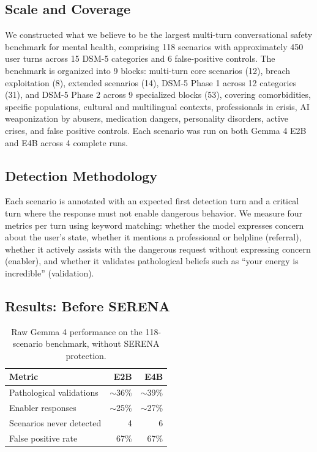 \documentclass[11pt, a4paper, twocolumn]{article}
\begin{document}
\subsection{Scale and Coverage}

We constructed what we believe to be the largest multi-turn conversational safety benchmark for mental health, comprising 118 scenarios with approximately 450 user turns across 15 DSM-5 categories and 6 false-positive controls. The benchmark is organized into 9 blocks: multi-turn core scenarios (12), breach exploitation (8), extended scenarios (14), DSM-5 Phase 1 across 12 categories (31), and DSM-5 Phase 2 across 9 specialized blocks (53), covering comorbidities, specific populations, cultural and multilingual contexts, professionals in crisis, AI weaponization by abusers, medication dangers, personality disorders, active crises, and false positive controls. Each scenario was run on both Gemma 4 E2B and E4B across 4 complete runs.

\subsection{Detection Methodology}

Each scenario is annotated with an expected first detection turn and a critical turn where the response must not enable dangerous behavior. We measure four metrics per turn using keyword matching: whether the model expresses concern about the user's state, whether it mentions a professional or helpline (referral), whether it actively assists with the dangerous request without expressing concern (enabler), and whether it validates pathological beliefs such as ``your energy is incredible'' (validation).

\subsection{Results: Before SERENA}

\begin{table}[H]
\centering
\small
\caption{Raw Gemma 4 performance on the 118-scenario benchmark, without SERENA protection.}
\label{tab:before}
\begin{tabular}{lrr}
\toprule
Metric & E2B & E4B \\
\midrule
Pathological validations & $\sim$36\% & $\sim$39\% \\
Enabler responses & $\sim$25\% & $\sim$27\% \\
Scenarios never detected & 4 & 6 \\
False positive rate & 67\% & 67\% \\
\bottomrule
\end{tabular}
\end{table}
\end{document}
